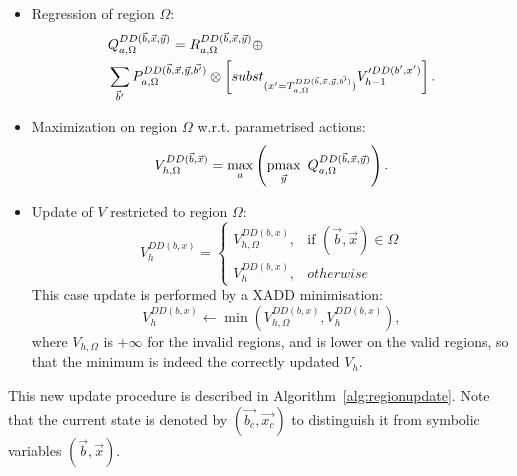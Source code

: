 \begin{itemize}
\item {
Regression of region $\Omega$:
\begin{align}
Q_{a,\Omega}^{DD(\vec{b},\vec{x},\vec{y})} & =  R_{a,\Omega}^{DD(\vec{b},\vec{x},\vec{y})} \oplus \nonumber \\
	& \hspace{-1.6cm}  \sum_{\vec{b}'}  P_{a,\Omega}^{DD(\vec{b},\vec{x},\vec{y},\vec{b'})} \otimes \left[ subst_{(x' = T_{a,\Omega}^{DD(\vec{b},\vec{x},\vec{y},\vec{b'})})} V_{h-1}'^{DD(b',x')} \right]. 
\label{eq:RTSDPregrDD}
\end{align}
}
\item{
Maximization on region $\Omega$ w.r.t. parametrised actions:
\begin{equation}
V_{h,\Omega}^{DD(\vec{b},\vec{x})} = \max_{a} \left( \pmax_{\vec{y}}~ Q_{a,\Omega}^{DD(\vec{b},\vec{x},\vec{y})} \right).
\label{eq:RTSDPmaxDD}
\end{equation}
}

\item{
Update of $V$ restricted to region $\Omega$:
\begin{equation}
V_h^{DD(b, x)} = \begin{cases}
	V_{h,\Omega}^{DD(b, x)},&\mbox{if } (\vec{b},\vec{x}) \in \Omega\\
	V_h^{DD(b, x)}, & otherwise
	\end{cases}
\end{equation}
}
This case update is performed by a XADD minimisation:
\begin{equation}
V_h^{DD(b, x)} \leftarrow \min( V_{h,\Omega}^{DD(b, x)}, V_h^{DD(b, x)}) ,
\end{equation}
where $V_{h,\Omega}$ is $+\infty$ for the invalid regions, and is lower on the valid regions, so that the minimum is indeed the correctly updated $V_h$.
\end{itemize}

This new update procedure is described in Algorithm~\ref{alg:regionupdate}. 
Note that the current state is denoted by $(\vec{b_c}, \vec{x_c})$ to distinguish it from symbolic variables $(\vec{b}, \vec{x})$.

